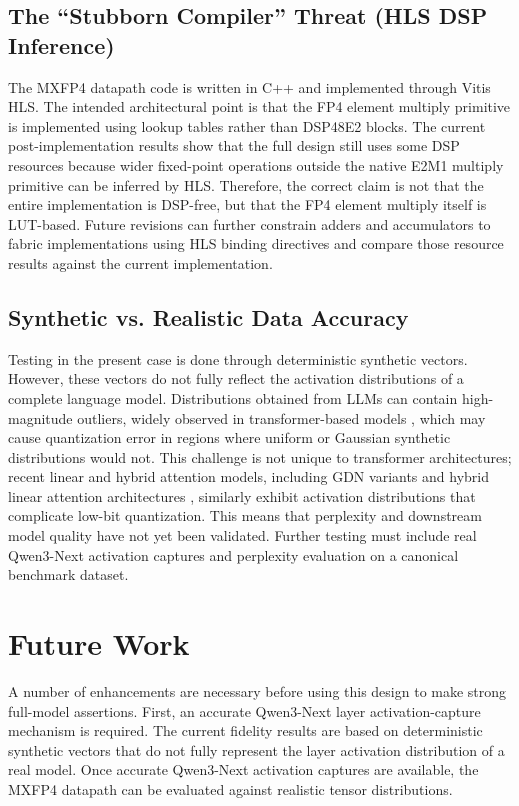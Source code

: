 ﻿\documentclass[conference]{IEEEtran}
\begin{document}
\subsection{The ``Stubborn Compiler'' Threat (HLS DSP Inference)}
The MXFP4 datapath code is written in C++ and implemented through Vitis HLS. The intended architectural point is that the FP4 element multiply primitive is implemented using lookup tables rather than DSP48E2 blocks. The current post-implementation results show that the full design still uses some DSP resources because wider fixed-point operations outside the native E2M1 multiply primitive can be inferred by HLS. Therefore, the correct claim is not that the entire implementation is DSP-free, but that the FP4 element multiply itself is LUT-based. Future revisions can further constrain adders and accumulators to fabric implementations using HLS binding directives and compare those resource results against the current implementation.

\subsection{Synthetic vs. Realistic Data Accuracy}
Testing in the present case is done through deterministic synthetic vectors. However, these vectors do not fully reflect the activation distributions of a complete language model. Distributions obtained from LLMs can contain high-magnitude outliers, widely observed in transformer-based models \cite{b2}, which may cause quantization error in regions where uniform or Gaussian synthetic distributions would not. This challenge is not unique to transformer architectures; recent linear and hybrid attention models, including GDN variants \cite{b3} and hybrid linear attention architectures \cite{b8}, similarly exhibit activation distributions that complicate low-bit quantization. This means that perplexity and downstream model quality have not yet been validated. Further testing must include real Qwen3-Next activation captures and perplexity evaluation on a canonical benchmark dataset.

\section{Future Work}
A number of enhancements are necessary before using this design to make strong full-model assertions. First, an accurate Qwen3-Next layer activation-capture mechanism is required. The current fidelity results are based on deterministic synthetic vectors that do not fully represent the layer activation distribution of a real model. Once accurate Qwen3-Next activation captures are available, the MXFP4 datapath can be evaluated against realistic tensor distributions.
\end{document}
